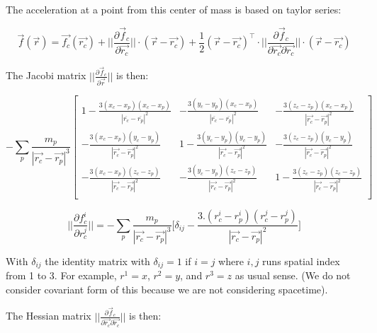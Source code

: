 \documentclass{article}
\begin{document}
The acceleration at a point from this center of mass is based on taylor series:

\begin{equation}
 \vec{f}(\vec{r}) = \vec{f_c}(\vec{r_c}) + ||\frac{\partial\vec{f}_c}{\partial\vec{r_c}}||\cdot (\vec{r} - \vec{r_c}) + \frac{1}{2} (\vec{r}-\vec{r_c})^\intercal \cdot   ||\frac{\partial\vec{f}_c}{\partial\vec{r_c} \partial\vec{r_c}}|| \cdot (\vec{r} - \vec{r_c})
 \end{equation}

The Jacobi matrix $||\frac{\partial\vec{f}_c}{\partial\vec{r}}||$  is then:



\begin{equation}
- \sum_p \frac{m_p}{|\vec{r_c}-\vec{r_p}|^3}
\begin{bmatrix}
1 - \frac{3(x_c-x_p)(x_c-x_p)}{|\overline{r_c}-\overline{r_p}|^2} & -\frac{3(y_c-y_p)(x_c-x_p)}{|\overline{r_c}-\overline{r_p}|^2}  & -\frac{3(z_c-z_p)(x_c-x_p)}{|\vec{r_c}-\vec{r_p}|^2}  \\
-\frac{3(x_c-x_p)(y_c-y_p)}{|\vec{r_c}-\vec{r_p}|^2}  & 1 - \frac{3(y_c-y_p)(y_c-y_p)}{|\vec{r_c}-\vec{r_p}|^2} &  -\frac{3(z_c-z_p)(y_c-y_p)}{|\vec{r_c}-\vec{r_p}|^2}\\
- \frac{3(x_c-x_p)(z_c-z_p)}{|\vec{r_c}-\vec{r_p}|^2}   &  -\frac{3(y_c-y_p)(z_c-z_p)}{|\vec{r_c}-\vec{r_p}|^2} &  1- \frac{3(z_c-z_p)(z_c-z_p)}{|\vec{r_c}-\vec{r_p}|^2} \\
\end{bmatrix}
 \end{equation}

\begin{equation}
 ||\frac{\partial f_c^i}{\partial r_c^j}|| = -\sum_p \frac{m_p}{|\vec{r_c}-\vec{r_p}|^3} \Big[ \delta_{ij} - \frac{3.(r_c^i-r_p^i)(r_c^j-r_p^j)}{|\vec{r_c}-\vec{r_p}|^2} \Big]
\end{equation}

With $\delta_{ij}$ the identity matrix with $\delta_{ij} = 1$ if $i=j$ where $i,j$ runs spatial index from 1 to 3. For example, $r^1=x$, $r^2=y$, and $r^3=z$ as usual sense. (We do not consider covariant form of this because we are not considering spacetime).


The Hessian matrix $||\frac{\partial\vec{f}_c}{\partial\vec{r_c} \partial\vec{r_c}}||$  is then:
\end{document}
